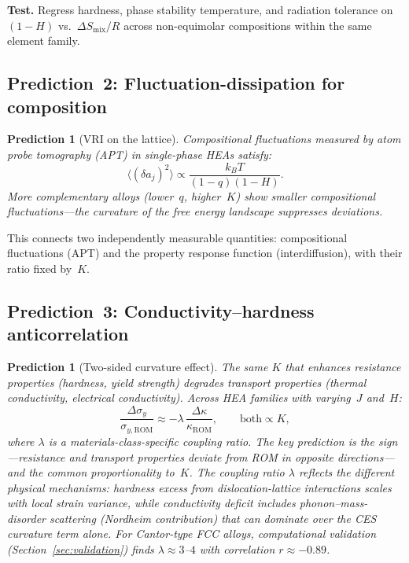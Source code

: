 \documentclass[12pt,letterpaper]{article}
\newtheorem{prediction}[theorem]{Prediction}
\theoremstyle{definition}
\begin{document}
\textbf{Test.}  Regress hardness, phase stability temperature, and radiation tolerance on $(1-H)$ vs.\ $\Delta S_{\mathrm{mix}}/R$ across non-equimolar compositions within the same element family.

\subsection{Prediction~2: Fluctuation-dissipation for composition}

\begin{prediction}[VRI on the lattice]\label{pred:VRI}
Compositional fluctuations measured by atom probe tomography (APT) in single-phase HEAs satisfy:
\begin{equation}
  \langle (\delta a_j)^2 \rangle \propto \frac{k_B T}{(1-q)(1-H)}.
\end{equation}
More complementary alloys (lower~$q$, higher~$K$) show smaller compositional fluctuations---the curvature of the free energy landscape suppresses deviations.
\end{prediction}

This connects two independently measurable quantities: compositional fluctuations (APT) and the property response function (interdiffusion), with their ratio fixed by~$K$.

\subsection{Prediction~3: Conductivity--hardness anticorrelation}

\begin{prediction}[Two-sided curvature effect]\label{pred:twosided}
The same $K$ that enhances resistance properties (hardness, yield strength) degrades transport properties (thermal conductivity, electrical conductivity).  Across HEA families with varying~$J$ and~$H$:
\begin{equation}
  \frac{\Delta\sigma_y}{\sigma_{y,\mathrm{ROM}}} \approx -\lambda\,\frac{\Delta\kappa}{\kappa_{\mathrm{ROM}}}, \qquad \text{both} \propto K,
\end{equation}
where $\lambda$ is a materials-class-specific coupling ratio.  The key prediction is the \emph{sign}---resistance and transport properties deviate from ROM in opposite directions---and the common proportionality to~$K$.  The coupling ratio $\lambda$ reflects the different physical mechanisms: hardness excess from dislocation-lattice interactions scales with local strain variance, while conductivity deficit includes phonon--mass-disorder scattering (Nordheim contribution) that can dominate over the CES curvature term alone.  For Cantor-type FCC alloys, computational validation (Section~\ref{sec:validation}) finds $\lambda \approx 3$--$4$ with correlation $r \approx -0.89$.
\end{prediction}
\end{document}

